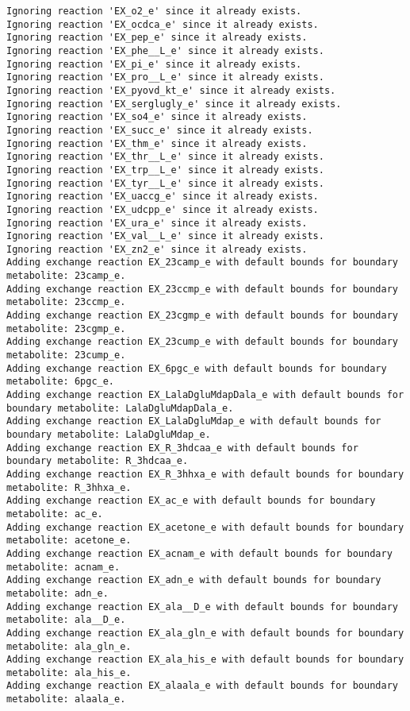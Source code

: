 \documentclass[
  letterpaper,
  DIV=11,
  numbers=noendperiod]{scrartcl}
\begin{document}
\begin{verbatim}
Ignoring reaction 'EX_o2_e' since it already exists.
Ignoring reaction 'EX_ocdca_e' since it already exists.
Ignoring reaction 'EX_pep_e' since it already exists.
Ignoring reaction 'EX_phe__L_e' since it already exists.
Ignoring reaction 'EX_pi_e' since it already exists.
Ignoring reaction 'EX_pro__L_e' since it already exists.
Ignoring reaction 'EX_pyovd_kt_e' since it already exists.
Ignoring reaction 'EX_serglugly_e' since it already exists.
Ignoring reaction 'EX_so4_e' since it already exists.
Ignoring reaction 'EX_succ_e' since it already exists.
Ignoring reaction 'EX_thm_e' since it already exists.
Ignoring reaction 'EX_thr__L_e' since it already exists.
Ignoring reaction 'EX_trp__L_e' since it already exists.
Ignoring reaction 'EX_tyr__L_e' since it already exists.
Ignoring reaction 'EX_uaccg_e' since it already exists.
Ignoring reaction 'EX_udcpp_e' since it already exists.
Ignoring reaction 'EX_ura_e' since it already exists.
Ignoring reaction 'EX_val__L_e' since it already exists.
Ignoring reaction 'EX_zn2_e' since it already exists.
Adding exchange reaction EX_23camp_e with default bounds for boundary metabolite: 23camp_e.
Adding exchange reaction EX_23ccmp_e with default bounds for boundary metabolite: 23ccmp_e.
Adding exchange reaction EX_23cgmp_e with default bounds for boundary metabolite: 23cgmp_e.
Adding exchange reaction EX_23cump_e with default bounds for boundary metabolite: 23cump_e.
Adding exchange reaction EX_6pgc_e with default bounds for boundary metabolite: 6pgc_e.
Adding exchange reaction EX_LalaDgluMdapDala_e with default bounds for boundary metabolite: LalaDgluMdapDala_e.
Adding exchange reaction EX_LalaDgluMdap_e with default bounds for boundary metabolite: LalaDgluMdap_e.
Adding exchange reaction EX_R_3hdcaa_e with default bounds for boundary metabolite: R_3hdcaa_e.
Adding exchange reaction EX_R_3hhxa_e with default bounds for boundary metabolite: R_3hhxa_e.
Adding exchange reaction EX_ac_e with default bounds for boundary metabolite: ac_e.
Adding exchange reaction EX_acetone_e with default bounds for boundary metabolite: acetone_e.
Adding exchange reaction EX_acnam_e with default bounds for boundary metabolite: acnam_e.
Adding exchange reaction EX_adn_e with default bounds for boundary metabolite: adn_e.
Adding exchange reaction EX_ala__D_e with default bounds for boundary metabolite: ala__D_e.
Adding exchange reaction EX_ala_gln_e with default bounds for boundary metabolite: ala_gln_e.
Adding exchange reaction EX_ala_his_e with default bounds for boundary metabolite: ala_his_e.
Adding exchange reaction EX_alaala_e with default bounds for boundary metabolite: alaala_e.

\end{verbatim}
\end{document}
